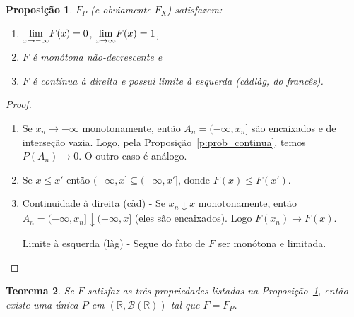 \documentclass[reqno, final]{book}
\newcommand*\1{\mathds{1}}
\newtheorem{theorem}{Teorema}[section]
\newtheorem{proposition}[theorem]{Proposição}
\begin{document}
\begin{proposition}
  \label{p:propried_F}
  $F_P$ (e obviamente $F_X$) satisfazem:
  \begin{enumerate}[\quad a)]
  \item $\smash{\lim\limits_{x \to -\infty}} F(x) = 0$, $\smash{\lim\limits_{x \to \infty}} F(x) = 1$,
  \item $F$ é monótona não-decrescente e
  \item $F$ é contínua à direita e possui limite à esquerda (càdlàg, do francês). 
  \end{enumerate}
\end{proposition}

\begin{proof}
  \begin{enumerate}[\quad a)]
  \item Se $x_n \to -\infty$ monotonamente, então $A_n = (-\infty, x_n]$ são encaixados e de interseção vazia.
    Logo, pela Proposição~\ref{p:prob_continua}, temos $P(A_n) \to 0$.
    O outro caso é análogo.
  \item Se $x \leq x'$ então $(-\infty, x] \subseteq (-\infty,x']$, donde $F(x) \leq F(x')$.
  \item Continuidade à direita (càd) - Se $x_n \downarrow x$ monotonamente, então $A_n = (-\infty, x_n] \downarrow (-\infty, x]$ (eles são encaixados).
    Logo $F(x_n) \to F(x)$.

    Limite à esquerda (làg) - Segue do fato de $F$ ser monótona e limitada. \qedhere
  \end{enumerate}
\end{proof}

\begin{theorem}
  Se $F$ satisfaz as três propriedades listadas na Proposição~\ref{p:propried_F}, então existe uma única $P$ em $(\mathbb{R}, \mathcal{B}(\mathbb{R}))$ tal que $F = F_P$.
\end{theorem}
\end{document}
